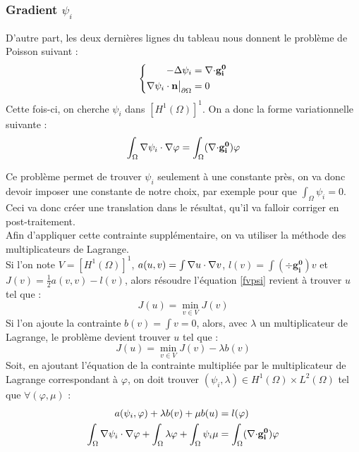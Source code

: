 \subsubsection{Gradient $\psi_i$}
\label{multLagrange}

D'autre part, les deux dernières lignes du tableau nous donnent le problème de Poisson suivant :
\begin{equation}\label{psi}
\left\{\begin{aligned}
-{\Delta}\psi_i &= {\nabla\cdot} \mathbf{g_i^0}\\
{\nabla}\psi_i\cdot \mathbf{n}{\big\rvert_{\partial\Omega}} &= 0
\end{aligned}\right.
\end{equation}
Cette fois-ci, on cherche $\psi_i$ dans $[H^1(\Omega)]^1$. On a donc la forme variationnelle suivante :
\begin{equation}\label{fvpsi}
\int_\Omega {\nabla}\psi_i\cdot{\nabla}\varphi = \int_\Omega ({\nabla\cdot} \mathbf{g_i^0})\varphi
\end{equation}

Ce problème permet de trouver $\psi_i$ seulement à une constante près, on va donc devoir imposer une constante de notre choix, par exemple pour que $\int_\Omega \psi_i = 0$. Ceci va donc créer une translation dans le résultat, qu'il va falloir corriger en post-traitement.\\
Afin d'appliquer cette contrainte supplémentaire, on va utiliser la méthode des multiplicateurs de Lagrange.\\
Si l'on note $V=[H^1(\Omega)]^1$, $a(u,v)=\int {\nabla} u \cdot {\nabla} v$, $l(v)=\int (\div \mathbf{g_i^0})v$ et $J(v)=\frac{1}{2}a(v,v)-l(v)$, alors résoudre l'équation \ref{fvpsi} revient à trouver $u$ tel que :
\[ J(u) = \min_{v\in V} J(v) \]
Si l'on ajoute la contrainte $b(v) = \int v = 0$, alors, avec $\lambda$ un multiplicateur de Lagrange, le problème devient trouver $u$ tel que :
\[ J(u) = \min_{v\in V} J(v) - \lambda b(v) \]
Soit, en ajoutant l'équation de la contrainte multipliée par le multiplicateur de Lagrange correspondant à $\varphi$, on doit trouver $(\psi_i,\lambda)\in H^1(\Omega)\times L^2(\Omega)$ tel que $\forall (\varphi,\mu)$ :
\begin{align}\label{fvpsiml}
a(\psi_i,\varphi) + \lambda b(v) + \mu b(u) &= l(\varphi) \notag \\
\int_\Omega {\nabla}\psi_i\cdot{\nabla}\varphi + \int_\Omega \lambda\varphi + \int_\Omega \psi_i\mu &= \int_\Omega ({\nabla\cdot} \mathbf{g_i^0})\varphi
\end{align}

